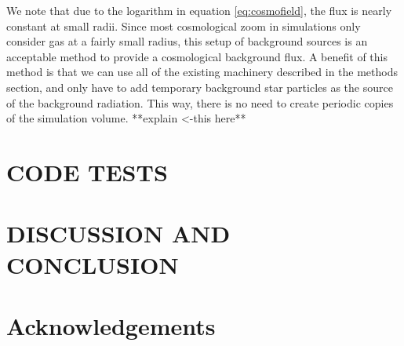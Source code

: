 \documentclass[fleqn,usenatbib]{mnras}
\begin{document}
We note that due to the logarithm in equation \ref{eq:cosmofield}, the flux is
 nearly constant at small radii. Since most cosmological zoom in simulations 
only consider gas at a fairly small radius, this setup of background sources is
 an acceptable method to provide a cosmological background flux. A benefit of
 this method is that we can use all of the existing machinery described in the 
methods section, and only have to add temporary background star particles as 
the source of the background radiation. This way, there is no need to create 
periodic copies of the simulation volume. **explain <-this here**

\section{CODE TESTS}\label{sec:tests}

\section{DISCUSSION AND CONCLUSION}\label{sec:dandc}

\section*{Acknowledgements}








\appendix


\bsp
\label{lastpage}
\end{document}
